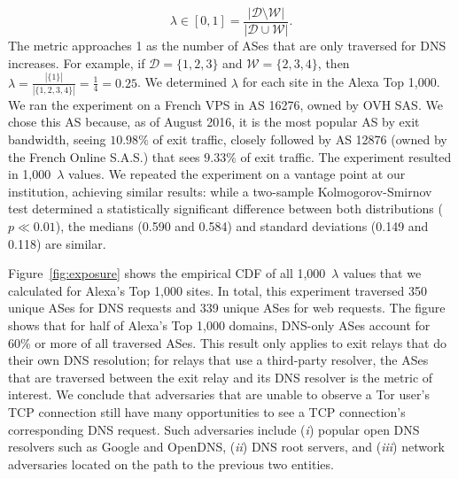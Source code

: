 \begin{equation}
\label{equ:exposure}
\lambda \in [0, 1] =
\frac{|\mathcal{D} \setminus \mathcal{W}|}
     {|\mathcal{D} \cup \mathcal{W}|}.
\end{equation}
\noindent
The metric approaches 1 as the number of ASes that are only traversed for DNS
increases.  For example, if $\mathcal{D} = \{1,2,3\}$ and $\mathcal{W} =
\{2,3,4\}$, then $\lambda = \frac{|\{1\}|}{|\{1,2,3,4\}|} = \frac{1}{4} =
0.25$.  We determined $\lambda$ for each site in the Alexa Top 1,000.  We ran
the experiment on a French VPS in AS 16276, owned by OVH SAS.  We chose this AS
because, as of August 2016, it is the most popular AS by exit bandwidth, seeing
$10.98\%$ of exit traffic, closely followed by AS 12876 (owned by the French
Online S.A.S.) that sees $9.33\%$ of exit traffic.  The experiment resulted in
1,000~$\lambda$ values.  We repeated the experiment on a vantage point at our
institution, achieving similar results: while a two-sample Kolmogorov-Smirnov
test determined a statistically significant difference between both
distributions ($p \ll 0.01$), the medians (0.590 and 0.584) and standard
deviations (0.149 and 0.118) are similar.
%
%

Figure~\ref{fig:exposure} shows the empirical CDF of all 1,000~$\lambda$ values
that we calculated for Alexa's Top 1,000 sites.  In total, this experiment
traversed 350 unique ASes for DNS requests and 339 unique ASes for web requests.
The figure shows that for half of Alexa's Top 1,000 domains, DNS-only ASes
account for 60\% or more of all traversed ASes.  This result
only applies to exit relays that do their own DNS resolution; for relays that
use a third-party resolver, the ASes that are traversed between
the exit relay and its DNS resolver is the metric of interest.  We conclude that adversaries that are
unable to observe a Tor user's TCP connection still have many opportunities to
see a TCP connection's corresponding DNS request.  Such adversaries include (\emph{i}) popular open
DNS resolvers such as Google and OpenDNS, (\emph{ii}) DNS root servers, and
(\emph{iii}) network adversaries located on the path to the previous two
entities.


